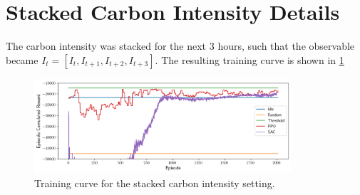 \section{Stacked Carbon Intensity Details} \label{sec:stacked_carbon_intensity_details}
The carbon intensity was stacked for the next 3 hours, such that the observable became $I_t = [I_t, I_{t+1}, I_{t+2}, I_{t+3}]$. The resulting training curve is shown in \cref{fig:training_curve_stacked}

\begin{figure}[H]
    \centering
    \includegraphics[width=0.85\textwidth]{figures/training_curve_stacked.png}
    \caption{Training curve for the stacked carbon intensity setting.}
    \label{fig:training_curve_stacked}
\end{figure}

